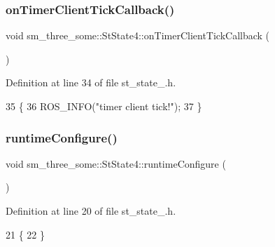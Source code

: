 \subsubsection{\texorpdfstring{on\+Timer\+Client\+Tick\+Callback()}{onTimerClientTickCallback()}}
{\footnotesize\ttfamily void sm\+\_\+three\+\_\+some\+::\+St\+State4\+::on\+Timer\+Client\+Tick\+Callback (\begin{DoxyParamCaption}{ }\end{DoxyParamCaption})\hspace{0.3cm}{\ttfamily [inline]}}



Definition at line 34 of file st\+\_\+state\+\_.\+h.


\begin{DoxyCode}
35     \{
36         ROS\_INFO(\textcolor{stringliteral}{"timer client tick!"});
37     \}
\end{DoxyCode}
\mbox{\label{structsm__three__some_1_1StState4_a44ef81afd6a1ad3144fbc39c44954439}} 
\subsubsection{\texorpdfstring{runtime\+Configure()}{runtimeConfigure()}}
{\footnotesize\ttfamily void sm\+\_\+three\+\_\+some\+::\+St\+State4\+::runtime\+Configure (\begin{DoxyParamCaption}{ }\end{DoxyParamCaption})\hspace{0.3cm}{\ttfamily [inline]}}



Definition at line 20 of file st\+\_\+state\+\_.\+h.


\begin{DoxyCode}
21     \{
22     \}
\end{DoxyCode}
\mbox{\label{structsm__three__some_1_1StState4_ae244f918fa096ecbb501e25b9ca07512}} 
